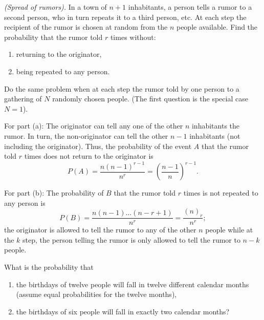 \begin{problem}[Handout 2, \# 13]
  \emph{(Spread of rumors).} In a town of \(n+1\) inhabitants, a person
  tells a rumor to a second person, who in turn repeats it to a third
  person, etc. At each step the recipient of the rumor is chosen at random
  from the \(n\) people available. Find the probability that the rumor told
  \(r\) times without:
  \begin{enumerate}[label=(\alph*),noitemsep]
  \item returning to the originator,
  \item being repeated to any person.
  \end{enumerate}
  Do the same problem when at each step the rumor told by one person to a
  gathering of \(N\) randomly chosen people. (The first question is the
  special case \(N=1\)).
\end{problem}
\begin{solution*}
  For part (a): The originator can tell any one of the other \(n\)
  inhabitants the rumor. In turn, the non-originator can tell the other
  \(n-1\) inhabitants (not including the originator). Thus, the probability
  of the event \(A\) that the rumor told \(r\) times does not return to the
  originator is
  \[
    P(A)=\frac{n(n-1)^{r-1}}{n^r}=\left(\frac{n-1}{n}\right)^{r-1}.
  \]

  For part (b): The probability of \(B\) that the rumor told \(r\) times
  is not repeated to any person is
  \[
    P(B)=\frac{n(n-1)\dotsc(n-r+1)}{n^r}=\frac{(n)_r}{n^r};
  \]
  the originator is allowed to tell the rumor to any of the other \(n\)
  people while at the \(k\) step, the person telling the rumor
  is only allowed to tell the rumor to \(n-k\) people.
\end{solution*}

\begin{problem}[Handout 2, \# 14]
  What is the probability that
  \begin{enumerate}[label=(\alph*),noitemsep]
  \item the birthdays of twelve people will fall in twelve different
    calendar months (assume equal probabilities for the twelve months),
  \item the birthdays of six people will fall in exactly two calendar
    months?
  \end{enumerate}
\end{problem}
\begin{solution*}
\end{solution*}

